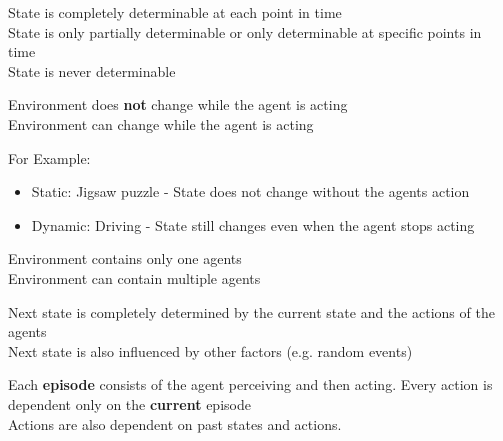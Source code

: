 \documentclass[
../EiKI_Summary.tex,
]
{subfiles}
\begin{document}
\begin{defbox}
     State is completely determinable at each point in time\\
     State is only partially determinable or only determinable at specific points in time\\
     State is never determinable
\end{defbox}

\begin{defbox}
     Environment does \textbf{not} change while the agent is acting\\
     Environment can change while the agent is acting
\end{defbox}

For Example:
\begin{itemize}
    \item Static: Jigsaw puzzle - State does not change without the agents action
    \item Dynamic: Driving - State still changes even when the agent stops acting
\end{itemize}

\begin{defbox}
     Environment contains only one agents\\
     Environment can contain multiple agents
\end{defbox}

\begin{defbox}
     Next state is completely determined by the current state and the actions of the agents\\
     Next state is also influenced by other factors (e.g. random events)
\end{defbox}

\begin{defbox}
     Each \textbf{episode} consists of the agent perceiving and then acting. Every action is dependent only on the \textbf{current} episode\\
     Actions are also dependent on past states and actions.
\end{defbox}
\end{document}
